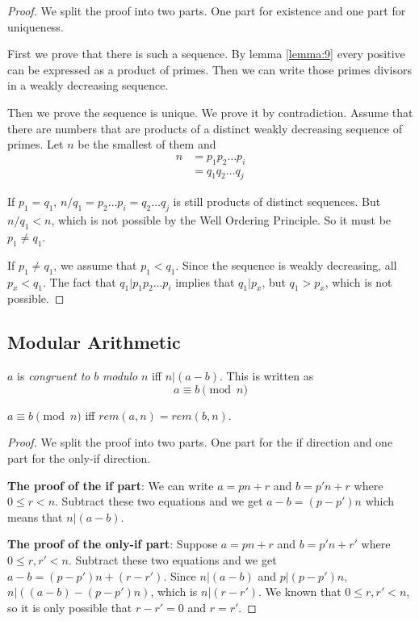 \documentclass[11pt]{article}
\begin{document}
\begin{proof}
We split the proof into two parts. One part for existence and one part for uniqueness.

First we prove that there is such a sequence. By lemma \ref{lemma:9} every positive can be
expressed as a product of primes. Then we can write those primes divisors in a weakly
decreasing sequence.

Then we prove the sequence is unique. We prove it by contradiction. Assume that there are numbers that are products of a distinct weakly decreasing sequence of primes. Let $n$ be
the smallest of them and
\begin{align*}
n &= p_1p_2 \dots p_i \\
&= q_1q_2 \dots q_j
\end{align*}

If $p_1 = q_1$, $n/q_1 = p_2 \dots p_i = q_2 \dots q_j$ is still products of distinct
sequences. But $n/q_1 < n$, which is not possible by the Well Ordering Principle. So it must
be $p_1 \neq q_1$.

If $p_1 \neq q_1$, we assume that $p_1 < q_1$. Since the sequence is weakly decreasing, all
$p_x < q_1$. The fact that $q_1|p_1p_2 \dots p_i$ implies that $q_1|p_x$, but $q_1 > p_x$,
which is not possible.

\end{proof}

\subsection{Modular Arithmetic}

\begin{definition}
$a$ is \emph{congruent to} $b$ \emph{modulo} $n$ iff $n|(a-b)$. This is written as
$$
a \equiv b \pmod{n}
$$
\end{definition}

\begin{lemma} \label{lemma:12}
$a \equiv b \pmod{n}$ iff $rem(a, n) = rem(b,n)$.
\end{lemma}

\begin{proof}
We split the proof into two parts. One part for the if direction and one part for the
only-if direction.

\textbf{The proof of the if part}: We can write $a = pn + r$ and $b = p'n + r$ where
$0 \leq r < n$. Subtract these two equations and we get $a - b = (p - p')n$ which means
that $n|(a-b)$.

\textbf{The proof of the only-if part}: Suppose $a=pn+r$ and $b=p'n+r'$ where
$0 \leq r,r' < n$. Subtract these two equations and we get $a-b=(p-p')n+(r-r')$. Since
$n|(a-b)$ and $p|(p-p')n$, $n|((a-b)-(p-p')n)$, which is $n|(r-r')$. We known that
$0 \leq r,r' < n$, so it is only possible that $r-r'=0$ and $r=r'$.

\end{proof}
\end{document}
